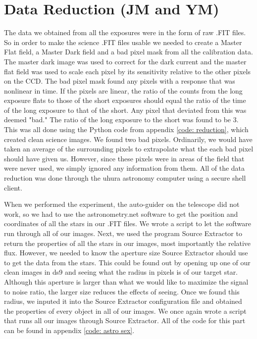 \documentclass{aastex61}
\begin{document}
\section{Data Reduction (JM and YM)}
The data we obtained from all the exposures were in the form of raw .FIT files. So in order to make the science .FIT files usable we needed to create a Master Flat field, a Master Dark field and a bad pixel mask from all the calibration data. The master dark image was used to correct for the dark current and the master flat field was used to scale each pixel by its sensitivity relative to the other pixels on the CCD. The bad pixel mask found any pixels with a response that was nonlinear in time. If the pixels are linear, the ratio of the counts from the long exposure flats to those of the short exposures should equal the ratio of the time of the long exposure to that of the short. Any pixel that deviated from this was deemed "bad." The ratio of the long exposure to the short was found to be 3. This was all done using the Python code from appendix \ref{code: reduction}, which created clean science images. We found two bad pixels. Ordinarily, we would have taken an average of the surrounding pixels to extrapolate what the each bad pixel should have given us. However, since these pixels were in areas of the field that were never used, we simply ignored any information from them. All of the data reduction was done through the uhura astronomy computer using a secure shell client. 

When we performed the experiment, the auto-guider on the telescope did not work, so we had to use the astronometry.net software to get the position and coordinates of all the stars in our .FIT files. We wrote a script to let the software run through all of our images. Next, we used the program Source Extractor to return the properties of all the stars in our images, most importantly the relative flux. However, we needed to know the aperture size Source Extractor should use to get the data from the stars. This could be found out by opening up one of our clean images in ds9 and seeing what the radius in pixels is of our target star. Although this aperture is larger than what we would like to maximize the signal to noise ratio, the larger size reduces the effects of seeing. Once we found this radius, we inputed it into the Source Extractor configuration file and obtained the properties of every object in all of our images. We once again wrote a script that runs all our images through Source Extractor. All of the code for this part can be found in appendix \ref{code: astro sex}.
\end{document}
